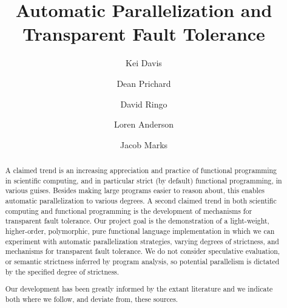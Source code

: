 \documentclass{llncs}
\begin{document}
%
%
\pagestyle{headings}  %
%
%
\title{Automatic Parallelization and Transparent Fault Tolerance}
%
%
\author{Kei Davis \and
        Dean Prichard \and
        David Ringo \and
        Loren Anderson \and
        Jacob Marks%
}
%
%
%

\maketitle              %

\setcounter{footnote}{0}

\begin{abstract}

A claimed trend is an increasing appreciation and practice of functional
programming in scientific computing, and in particular strict (by default)
functional programming, in various guises.  Besides making large programs
easier to reason about, this enables automatic parallelization to various
degrees.  A second claimed trend in both scientific computing and functional
programming is the development of mechanisms for transparent fault tolerance.
Our project goal is the demonstration of a light-weight, higher-order,
polymorphic, pure functional language implementation in which we can
experiment with automatic parallelization strategies, varying degrees of
strictness, and mechanisms for transparent fault tolerance.
%
We do not consider speculative evaluation, or semantic strictness inferred by
program analysis, so potential parallelism is dictated by the specified degree of
strictness.

\hspace{0.2in} Our development has been greatly informed by the extant
literature and we indicate both where we follow, and deviate from,
these sources.


\end{abstract}
\end{document}

